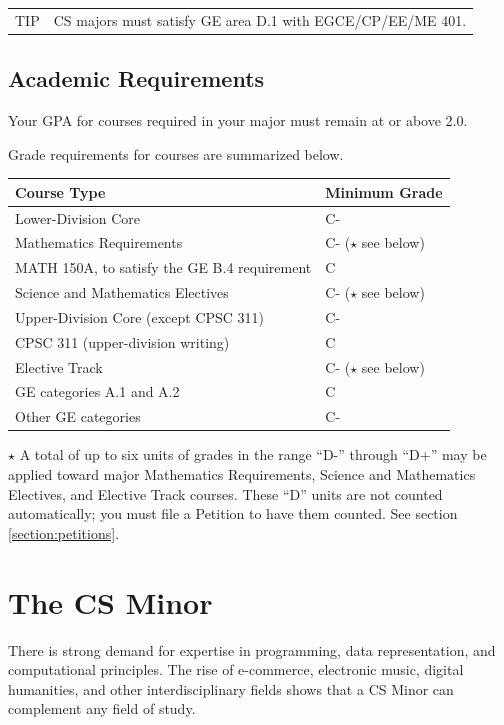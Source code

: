 \documentclass{book}
\newenvironment{tip}{
  \tcolorbox \begin{tabular}{m{.5in} m{5in}} \Large{TIP} &
}{
  \end{tabular} \endtcolorbox
}
\begin{document}
\begin{tip}
CS majors must satisfy GE area D.1 with EGCE/CP/EE/ME 401.
\end{tip}

\section{Academic Requirements}

Your GPA for courses required in your major must remain at or above 2.0.

Grade requirements for courses are summarized below.

\begin{center}
\begin{tabular}{|l|l|} \hline
  \textbf{Course Type} & \textbf{Minimum Grade} \\ \hline
  Lower-Division Core & C- \\ \hline
  Mathematics Requirements & C- ($\star$ see below) \\ \hline
  MATH 150A, to satisfy the GE B.4 requirement & C \\ \hline
  Science and Mathematics Electives & C- ($\star$ see below) \\ \hline
  Upper-Division Core (except CPSC 311) & C- \\ \hline
  CPSC 311 (upper-division writing) & C \\ \hline
  Elective Track & C- ($\star$ see below) \\ \hline
  GE categories A.1 and A.2 & C \\ \hline
  Other GE categories & C- \\ \hline
\end{tabular}
\end{center}

$\star$ A total of up to six units of grades in the range ``D-'' through ``D+'' may be applied toward major Mathematics Requirements, Science and Mathematics Electives, and Elective Track courses. These ``D'' units are not counted automatically; you must file a Petition to have them counted. See section \ref{section:petitions}.

\chapter{The CS Minor}

There is strong demand for expertise in programming, data representation, and computational principles. The rise of e-commerce, electronic music, digital humanities, and other interdisciplinary fields shows that a CS Minor can complement any field of study.
\end{document}
